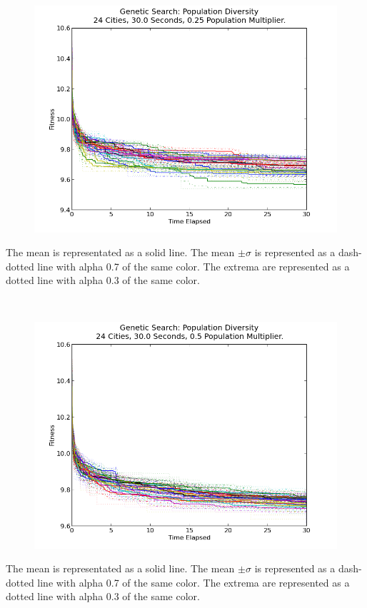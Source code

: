 \documentclass[10pt, conference, compsocconf]{IEEEtran}
\begin{document}
\newpage
$ $
\newpage
\begin{figure}[t]
  \centering
    \includegraphics[width=1\textwidth]{../Example_Output_Images/24_cities/30_seconds/populationDiversity_025_populationMuliplier.png}
\end{figure}
The mean is representated as a solid line. The mean $\pm\sigma$ is represented as a dash-dotted line with alpha 0.7 of the same color. The extrema are represented as a dotted line with alpha 0.3 of the same color.
$ $


\newpage
$ $
\newpage
\begin{figure}[t]
  \centering
    \includegraphics[width=1\textwidth]{../Example_Output_Images/24_cities/30_seconds/populationDiversity_05_populationMuliplier.png}
\end{figure}
The mean is representated as a solid line. The mean $\pm\sigma$ is represented as a dash-dotted line with alpha 0.7 of the same color. The extrema are represented as a dotted line with alpha 0.3 of the same color.
$ $
\end{document}
